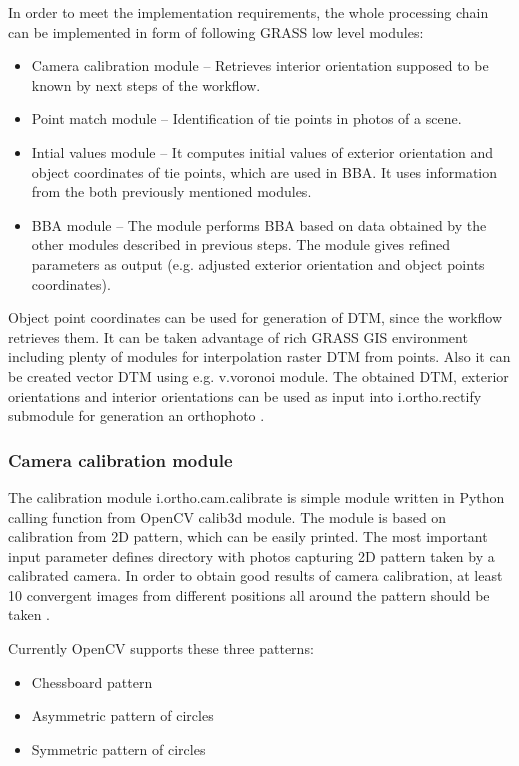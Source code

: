\documentclass[a4paper,12pt]{article}
\begin{document}
In order to meet the implementation requirements, the whole processing chain can be implemented in form
of following GRASS low level modules:

\begin{itemize}
\item Camera calibration module -- Retrieves interior orientation supposed to be known by 
next steps of the workflow.
\item Point match module -- Identification of tie points in photos of a scene.
\item Intial values module -- It computes initial values of exterior orientation and 
object coordinates of tie points, which are used in BBA. It uses information from the both
previously mentioned modules.
\item BBA module -- The module performs BBA based on data obtained by the other modules described in previous steps.
The module gives refined parameters as output (e.g. adjusted exterior orientation and object points coordinates).   
\end{itemize}

Object point coordinates can be used for generation of DTM, since the workflow retrieves them. 
It can be taken advantage of rich GRASS GIS  environment
including plenty of modules for interpolation raster DTM from points. Also it can be 
created vector DTM using e.g. v.voronoi module. 
The obtained DTM, exterior orientations and interior orientations
can be used as input into i.ortho.rectify submodule for generation an orthophoto . 

\subsubsection{Camera calibration module}

The calibration module i.ortho.cam.calibrate is simple module written in Python calling
function from OpenCV calib3d module. The module is based on cali\-bration from 2D pattern, which can be easily printed. 
The most important input parameter defines directory with photos capturing 2D pattern 
taken by a calibrated camera. In order to obtain good results of camera calibration, at least 10 convergent images 
from different positions all around the pattern should be taken \cite{camera_calibration2013opencv}.

Currently OpenCV supports these three patterns:
\begin{itemize}
\item Chessboard pattern 
\item Asymmetric pattern of circles
\item Symmetric pattern of circles
\end{itemize}
\end{document}
